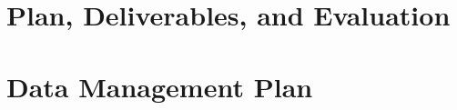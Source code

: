 \documentclass[10pt]{article}
\begin{document}
\thispagestyle{empty}
%



%




%


%
%









%



%
%



%

\section{Plan, Deliverables, and Evaluation}






\newpage
\setlength{\itemsep}{0pt}
\setcounter{page}{1}

\section*{Data Management Plan}


\newpage
\setlength{\itemsep}{0pt}
\setcounter{page}{1}



\end{document}
